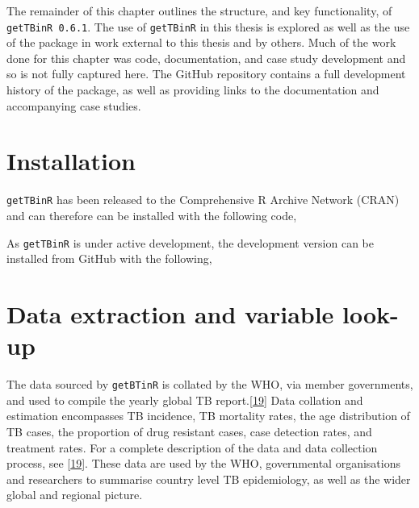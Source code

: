 \documentclass[11pt,twoside]{bristolthesis}
\begin{document}
  The remainder of this chapter outlines the structure, and key functionality, of \texttt{getTBinR\ 0.6.1}. The use of \texttt{getTBinR} in this thesis is explored as well as the use of the package in work external to this thesis and by others. Much of the work done for this chapter was code, documentation, and case study development and so is not fully captured here. The GitHub repository contains a full development history of the package, as well as providing links to the documentation and accompanying case studies.
  
  \hypertarget{installation}{%
  \section{Installation}\label{installation}}
  
  \texttt{getTBinR} has been released to the Comprehensive R Archive Network (CRAN) and can therefore can be installed with the following code,
  \begin{Shaded}
  \begin{Highlighting}[]
  \NormalTok{(}\NormalTok{)}
  \end{Highlighting}
  \end{Shaded}
  As \texttt{getTBinR} is under active development, the development version can be installed from GitHub with the following,
  \begin{Shaded}
  \begin{Highlighting}[]
  \OperatorTok{::}\NormalTok{(}\NormalTok{)}
  \end{Highlighting}
  \end{Shaded}
  \hypertarget{data-extraction-and-variable-look-up}{%
  \section{Data extraction and variable look-up}\label{data-extraction-and-variable-look-up}}
  
  The data sourced by \texttt{getBTinR} is collated by the WHO, via member governments, and used to compile the yearly global TB report.{[}\protect\hyperlink{ref-WHO:2018}{19}{]} Data collation and estimation encompasses TB incidence, TB mortality rates, the age distribution of TB cases, the proportion of drug resistant cases, case detection rates, and treatment rates. For a complete description of the data and data collection process, see {[}\protect\hyperlink{ref-WHO:2018}{19}{]}. These data are used by the WHO, governmental organisations and researchers to summarise country level TB epidemiology, as well as the wider global and regional picture.
  
\end{document}

